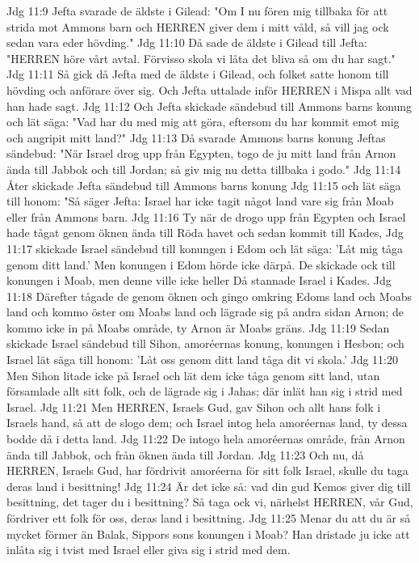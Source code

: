 Jdg 11:9  Jefta svarade de äldste i Gilead: "Om I nu fören mig tillbaka för att strida mot Ammons barn och HERREN giver dem i mitt våld, så vill jag ock sedan vara eder hövding."
Jdg 11:10  Då sade de äldste i Gilead till Jefta: "HERREN höre vårt avtal. Förvisso skola vi låta det bliva så om du har sagt."
Jdg 11:11  Så gick då Jefta med de äldste i Gilead, och folket satte honom till hövding och anförare över sig. Och Jefta uttalade inför HERREN i Mispa allt vad han hade sagt.
Jdg 11:12  Och Jefta skickade sändebud till Ammons barns konung och lät säga: "Vad har du med mig att göra, eftersom du har kommit emot mig och angripit mitt land?"
Jdg 11:13  Då svarade Ammons barns konung Jeftas sändebud: "När Israel drog upp från Egypten, togo de ju mitt land från Arnon ända till Jabbok och till Jordan; så giv mig nu detta tillbaka i godo."
Jdg 11:14  Åter skickade Jefta sändebud till Ammons barns konung
Jdg 11:15  och lät säga till honom: "Så säger Jefta: Israel har icke tagit något land vare sig från Moab eller från Ammons barn.
Jdg 11:16  Ty när de drogo upp från Egypten och Israel hade tågat genom öknen ända till Röda havet och sedan kommit till Kades,
Jdg 11:17  skickade Israel sändebud till konungen i Edom och lät säga: 'Låt mig tåga genom ditt land.' Men konungen i Edom hörde icke därpå. De skickade ock till konungen i Moab, men denne ville icke heller Då stannade Israel i Kades.
Jdg 11:18  Därefter tågade de genom öknen och gingo omkring Edoms land och Moabs land och kommo öster om Moabs land och lägrade sig på andra sidan Arnon; de kommo icke in på Moabs område, ty Arnon är Moabs gräns.
Jdg 11:19  Sedan skickade Israel sändebud till Sihon, amoréernas konung, konungen i Hesbon; och Israel lät säga till honom: 'Låt oss genom ditt land tåga dit vi skola.'
Jdg 11:20  Men Sihon litade icke på Israel och lät dem icke tåga genom sitt land, utan församlade allt sitt folk, och de lägrade sig i Jahas; där inlät han sig i strid med Israel.
Jdg 11:21  Men HERREN, Israels Gud, gav Sihon och allt hans folk i Israels hand, så att de slogo dem; och Israel intog hela amoréernas land, ty dessa bodde då i detta land.
Jdg 11:22  De intogo hela amoréernas område, från Arnon ända till Jabbok, och från öknen ända till Jordan.
Jdg 11:23  Och nu, då HERREN, Israels Gud, har fördrivit amoréerna för sitt folk Israel, skulle du taga deras land i besittning!
Jdg 11:24  Är det icke så: vad din gud Kemos giver dig till besittning, det tager du i besittning? Så taga ock vi, närhelst HERREN, vår Gud, fördriver ett folk för oss, deras land i besittning.
Jdg 11:25  Menar du att du är så mycket förmer än Balak, Sippors sons konungen i Moab? Han dristade ju icke att inlåta sig i tvist med Israel eller giva sig i strid med dem.
